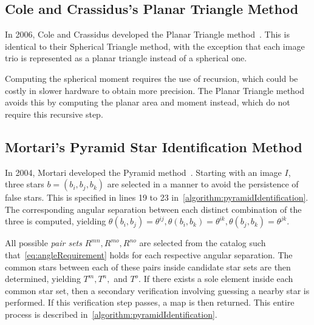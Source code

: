 \subsection{Cole and Crassidus's Planar Triangle Method}\label{subsec:coleAndCrassidus'sPlanarTriangleMethod}
In 2006, Cole and Crassidus developed the Planar Triangle method~\cite{Planar}.
This is identical to their Spherical Triangle method, with the exception that each image trio is represented as a
planar triangle instead of a spherical one.

Computing the spherical moment requires the use of recursion, which could be costly in slower hardware to obtain more
precision.
The Planar Triangle method avoids this by computing the planar area and moment instead, which do not require this
recursive step.

\subsection{Mortari's Pyramid Star Identification Method}\label{subsec:mortari'sPyramidStarIdentificationMethod}
In 2004, Mortari developed the Pyramid method~\cite{Pyramid}.
Starting with an image $I$, three stars $b = (b_i, b_j, b_k)$ are selected in a manner to avoid the persistence of
false stars.
This is specified in lines 19 to 23 in~\autoref{algorithm:pyramidIdentification}.
The corresponding angular separation between each distinct combination of the three is computed, yielding $\theta
(b_i, b_j) = \theta^{ij}, \theta(b_i, b_k) = \theta^{ik}, \theta(b_j, b_k) = \theta^{jk}$.

All possible \textit{pair sets} $R^{mn}, R^{mo}, R^{no}$ are selected from the catalog such
that~\autoref{eq:angleRequirement} holds for each respective angular separation.
The common stars between each of these pairs inside candidate star sets are then determined, yielding $T^m, T^n, $ and
$T^o$.
If there exists a sole element inside each common star set, then a secondary verification involving guessing a nearby
star is performed.
If this verification step passes, a map is then returned.
This entire process is described in~\autoref{algorithm:pyramidIdentification}.

